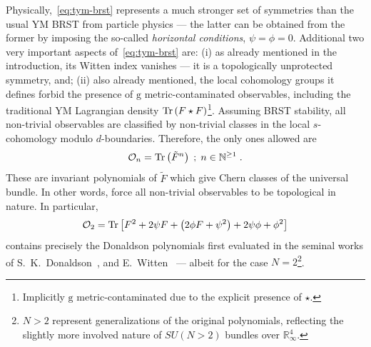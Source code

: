 \documentclass[../main.tex]{subfiles}
\begin{document}
Physically,~\eqref{eq:tym-brst} represents a much stronger set of symmetries than the usual YM BRST from particle physics --- the latter can be obtained from the former by imposing the so-called \emph{horizontal conditions}, $\psi=\phi=0$. Additional two very important aspects of~\eqref{eq:tym-brst} are: (i) as already mentioned in the introduction, its Witten index vanishes --- it is a topologically unprotected symmetry, and; (ii) also already mentioned, the local cohomology groups it defines forbid the presence of $ \mathrm{g} $ metric-contaminated observables, including the traditional YM Lagrangian density $ \operatorname{Tr} \left( F \star F \right) $\footnote{Implicitly $\mathrm{g}$ metric-contaminated due to the explicit presence of $\star$.}. Assuming BRST stability, all non-trivial observables are classified by non-trivial classes in the local $s$-cohomology modulo $d$-boundaries. Therefore, the only ones allowed are
\begin{equation}
  \label{eq:tym-observables}
  \mathcal{O}_n = \operatorname{Tr} \left( \tilde{F}^n \right) \; ; \; n \in {\mathbb{N}}^{\ge 1} \;.
\end{equation}
These are invariant polynomials of $\tilde{F}$ which give Chern classes of the universal bundle. In other words,  force all non-trivial observables to be topological in nature. In particular,
\begin{equation}
  \label{eq:donaldson-polynomials}
  \mathcal{O}_2 = \operatorname{Tr} \left[ F^2 + 2\psi F + \left( 2\phi F + \psi^2 \right) + 2\psi \phi + \phi^2\right]
\end{equation}
contains precisely the Donaldson polynomials first evaluated in the seminal works of S.~K.~Donaldson~\cite{donaldson1983a,donaldson1990a}, and E.~Witten~\cite{witten1988d} --- albeit for the case $N=2$\footnote{$N>2$ represent generalizations of the original polynomials, reflecting the slightly more involved nature of $SU(N>2)$ bundles over $\mathbb{R}^4_{\infty}$.}.
\end{document}
